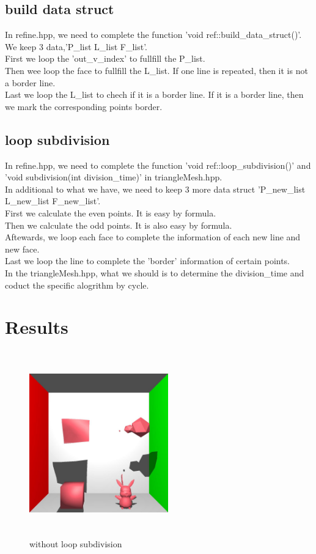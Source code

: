 \documentclass[acmtog]{acmart}
\begin{document}
\subsection{build data struct}
In refine.hpp, we need to complete the function 'void ref::build\_data\_struct()'.
\\We keep 3 data,'P\_list L\_list F\_list'.
\\First we loop the 'out\_v\_index' to fullfill the P\_list.
\\Then wee loop the face to fullfill the L\_list. If one line is repeated, then it is not a border line.
\\Last we loop the L\_list to chech if it is a border line. If it is a border line, then we mark the corresponding points border.
\vspace*{1 ex}
\subsection{loop subdivision}
In refine.hpp, we need to complete the function 'void ref::loop\_subdivision()' and 'void subdivision(int division\_time)' in triangleMesh.hpp.
\\In additional to what we have, we need to keep 3 more data struct 'P\_new\_list L\_new\_list F\_new\_list'.
\\First we calculate the even points. It is easy by formula.
\\Then we calculate the odd points. It is also easy by formula.
\\Aftewards, we loop each face to complete the information of each new line and new face.
\\Last we loop the line to complete the 'border' information of certain points.
\\In the triangleMesh.hpp, what we should is to determine the division\_time and coduct the specific alogrithm by cycle.

\vspace*{2 ex}

\section{Results}

\begin{figure}[h]
\centering
\includegraphics[width=6cm,height=8cm]{no-subdivision.jpg}
\caption{without loop subdivision}
\end{figure}
\end{document}
